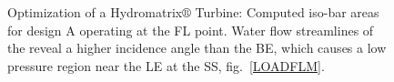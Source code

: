 \begin{figure}[h!]
\begin{minipage}[b]{1\linewidth}
 \centering
\end{minipage}
\caption{Optimization of a Hydromatrix$\circledR$ Turbine: Computed iso-bar areas for design A operating at the FL point. Water flow streamlines of the  reveal a higher incidence angle than the BE, which causes a low pressure region near the LE at the SS, fig.\ \ref{LOADFLM}. }
\label{design-FL-M}
\end{figure}


